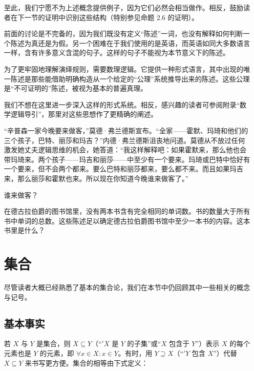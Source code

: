 \begin{remark}
至此，我们宁愿不为上述概念提供例子，因为它们必然会相当做作。相反，鼓励读者在下一节的证明中识别这些结构（特别参见命题 2.6 的证明）。

前面的讨论是不完备的，因为我们既没有定义“陈述”一词，也没有解释如何判断一个陈述为真还是为假。另一个困难在于我们使用的是英语，而英语如同大多数语言一样，含有许多意义含混的句子。这样的句子不能视为本节意义下的陈述。

为了更牢固地理解演绎规则，需要数理逻辑。它提供一种形式语言，其中出现的唯一陈述是那些能借助明确构造从一个给定的“公理”系统推导出来的陈述。这些公理是“不可证明的”陈述，被视为基本的普遍真理。

我们不想在这里进一步深入这样的形式系统。相反，感兴趣的读者可参阅附录“数学逻辑导引”，那里对这些思想作了更精确的阐述。

\end{remark}

\exerciseshead

\begin{exercises}
\item

“辛普森一家今晚要来做客，”莫德·弗兰德斯宣布。“全家——霍默、玛琦和他们的三个孩子，巴特、丽莎和玛吉？”内德·弗兰德斯沮丧地问道。莫德从不放过任何激发她丈夫逻辑思维的机会，她答道：“我这样解释吧：如果霍默来，那么他也会带玛琦来。两个孩子——玛吉和丽莎——中至少有一个要来。玛琦或巴特中恰好有一个要来，但不会两个都来。要么巴特和丽莎都来，要么都不来。而且如果玛吉来，那么丽莎和霍默也来。所以现在你知道今晚谁来做客了。”

谁来做客？

\item

在德古拉伯爵的图书馆里，没有两本书含有完全相同的单词数。书的数量大于所有书中单词的总数。这些陈述足以确定德古拉伯爵图书馆中至少一本书的内容。这本书里是什么？

\end{exercises}

\section{集合}

尽管读者大概已经熟悉了基本的集合论，我们在本节中仍回顾其中一些相关的概念与记号。

\subsection*{基本事实}

若 $X$ 与 $Y$ 是集合，则 $X \subseteq Y$（“$'X$ 是 $Y$ 的子集”或“$X$ 包含于 $Y$”）表示 $X$ 的每个元素也是 $Y$ 的元素，即 $\forall x \in X: x \in Y$。有时，用 $Y \supseteq X$（“$'Y$ 包含 $X$”）代替 $X \subseteq Y$ 来书写更方便。集合的相等由下式定义：

